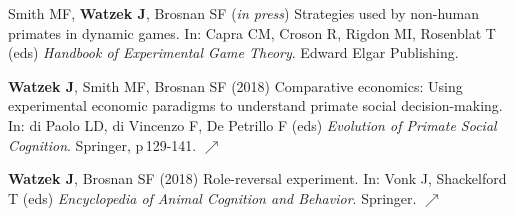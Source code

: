 \documentclass[]{friggeri-cv}
\begin{document}
\begin{enumerate}[resume, label={[\,\arabic*\,]}]
  \item Smith MF, \textbf{Watzek J}, Brosnan SF (\emph{in press}) Strategies used by non-human primates in dynamic games. In: Capra CM, Croson R, Rigdon MI, Rosenblat T (eds) \emph{Handbook of Experimental Game Theory}. Edward Elgar Publishing.
  \item \textbf{Watzek J}, Smith MF, Brosnan SF (2018) Comparative economics: Using experimental economic paradigms to understand primate social decision-making. In: di Paolo LD, di Vincenzo F, De Petrillo F (eds) \emph{Evolution of Primate Social Cognition}. Springer, p\,129-141. \href{https://doi.org/10.1007/978-3-319-93776-2_9}{\small $\nearrow$}
  \item \textbf{Watzek J}, Brosnan SF (2018) Role-reversal experiment. In: Vonk J, Shackelford T (eds) \emph{Encyclopedia of Animal Cognition and Behavior}. Springer. \href{https://doi.org/10.1007/978-3-319-47829-6_1497-1}{\small $\nearrow$}
\end{enumerate}


\newpage



\end{document}
